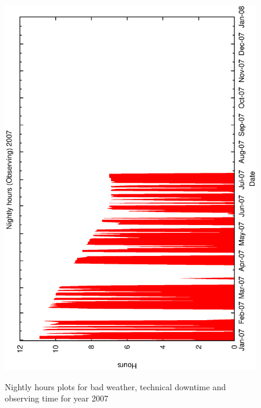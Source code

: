 \begin{figure}[h]
\begin{center}
{    \includegraphics[scale=0.4, angle=-90]{figures/met_nightly_stats_obs2007.eps}
  }
\caption{Nightly hours plots for bad weather, technical downtime and observing time for year 2007}
\end{center}
\end{figure}


